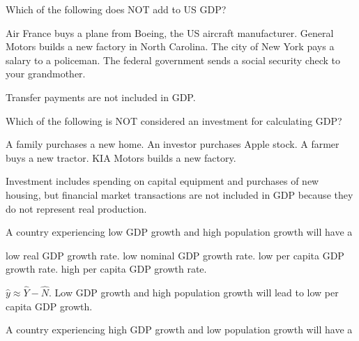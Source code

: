 \documentclass[addpoints,11pt]{exam}
\theoremstyle{definition}
\begin{document}
\begin{questions}
	

		
		\question Which of the following does NOT add to US GDP?
		
		\begin{choices}
			\choice Air France buys a plane from Boeing, the US aircraft manufacturer.
			\choice General Motors builds a new factory in North Carolina.
			\choice The city of New York pays a salary to a policeman.
			\CorrectChoice The federal government sends a social security check to your grandmother.
		\end{choices}
		
		\begin{solution}
			Transfer payments are not included in GDP.
		\end{solution}
		
		\question Which of the following is NOT considered an investment for calculating GDP?
		
		\begin{choices}
			\choice A family purchases a new home.
			\CorrectChoice An investor purchases Apple stock.
			\choice A farmer buys a new tractor.
			\choice KIA Motors builds a new factory.
		\end{choices}
		
		\begin{solution}
			Investment includes spending on capital equipment and purchases of new housing, but financial market transactions are not included in GDP because they do not represent real production.
		\end{solution}
		
		\question A country experiencing low GDP growth and high population growth will have a
		
		\begin{choices}
			\choice low real GDP growth rate.
			\choice low nominal GDP growth rate.
			\CorrectChoice low per capita GDP growth rate.
			\choice high per capita GDP growth rate.
		\end{choices}
		
		\begin{solution}
			$\hat{y} \approx \hat{Y} - \hat{N}$. Low GDP growth and high population growth will lead to low per capita GDP growth.
		\end{solution}

\newpage

	\question A country experiencing high GDP growth and low population growth will have a
	

\end{questions}
\end{document}
